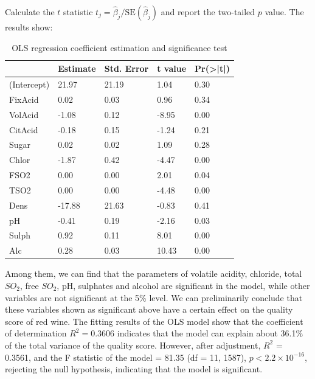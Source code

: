 \documentclass[
  doc,floatsintext]{apa6}
\begin{document}
Calculate the \(t\) statistic \(t_j = \hat\beta_j / \mathrm{SE}(\hat\beta_j)\) and report the two-tailed \(p\) value. The results show:

\begin{table}[H]

\begin{center}
\begin{threeparttable}

\caption{\label{tab:ols-model}OLS regression coefficient estimation and significance test}

\begin{tabular}{lllll}
\toprule
 & \multicolumn{1}{c}{Estimate} & \multicolumn{1}{c}{Std. Error} & \multicolumn{1}{c}{t value} & \multicolumn{1}{c}{Pr(>|t|)}\\
\midrule
(Intercept) & 21.97 & 21.19 & 1.04 & 0.30\\
FixAcid & 0.02 & 0.03 & 0.96 & 0.34\\
VolAcid & -1.08 & 0.12 & -8.95 & 0.00\\
CitAcid & -0.18 & 0.15 & -1.24 & 0.21\\
Sugar & 0.02 & 0.02 & 1.09 & 0.28\\
Chlor & -1.87 & 0.42 & -4.47 & 0.00\\
FSO2 & 0.00 & 0.00 & 2.01 & 0.04\\
TSO2 & 0.00 & 0.00 & -4.48 & 0.00\\
Dens & -17.88 & 21.63 & -0.83 & 0.41\\
pH & -0.41 & 0.19 & -2.16 & 0.03\\
Sulph & 0.92 & 0.11 & 8.01 & 0.00\\
Alc & 0.28 & 0.03 & 10.43 & 0.00\\
\bottomrule
\end{tabular}

\end{threeparttable}
\end{center}

\end{table}

Among them, we can find that the parameters of volatile acidity, chloride, total \(SO_2\), free \(SO_2\), pH, sulphates and alcohol are significant in the model, while other variables are not significant at the 5\% level. We can preliminarily conclude that these variables shown as significant above have a certain effect on the quality score of red wine. The fitting results of the OLS model show that the coefficient of determination \(R^2 = 0.3606\) indicates that the model can explain about 36.1\% of the total variance of the quality score. However, after adjustment, \(R^2\) = 0.3561, and the F statistic of the model = 81.35 (df = 11, 1587), \(p<2.2\times10^{-16}\), rejecting the null hypothesis, indicating that the model is significant.
\end{document}
